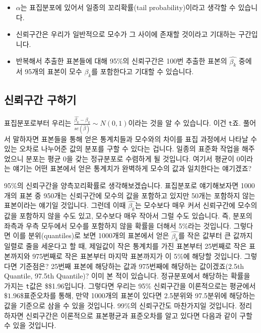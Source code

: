 \documentclass[
]{book}
\begin{document}
\begin{itemize}
\item
  \(\alpha\)는 표집분포에 있어서 일종의 꼬리확률(tail probability)이라고 생각할 수 있습니다.
\item
  신뢰구간은 우리가 일반적으로 모수가 그 사이에 존재할 것이라고 기대하는 구간입니다.
\item
  반복해서 추출한 표본들에 대해 95\%의 신뢰구간은 100번 추출한 표본의 \(\hat{\beta_k}\) 중에서 95개의 표본이 모수 \(\beta_k\)를 포함한다고 기대할 수 있습니다.
\end{itemize}

\hypertarget{uxc2e0uxb8b0uxad6cuxac04-uxad6cuxd558uxae30}{%
\subsection{신뢰구간 구하기}\label{uxc2e0uxb8b0uxad6cuxac04-uxad6cuxd558uxae30}}

표집분포로부터 우리는 \(\frac{\hat{\beta_k}-\beta_k}{se(\hat{\beta})} \sim N(0,1)\)이라는 것을 알 수 있습니다. 이건 \texttt{t}죠. 풀어서 말하자면 표본들을 통해 얻은 통계치들과 모수와의 차이를 표집 과정에서 나타날 수 있는 오차로 나누어준 값의 분포를 구할 수 있다는 겁니다. 일종의 표준화 작업을 해주었으니 분포는 평균 0을 갖는 정규분포로 수렴하게 될 것입니다. 여기서 평균이 0이라는 얘기는 어떤 표본에서 얻은 통계치가 완벽하게 모수의 값과 일치한다는 얘기겠죠?

95\%의 신뢰구간을 양측꼬리확률로 생각해보겠습니다. 표집분포로 얘기해보자면 1000개의 표본 중 950개는 신뢰구간에 모수의 값을 포함하고 있지만 50개는 포함하지 않는 표본이라는 얘기일 것입니다. 그런데 이때 \(\hat{\beta_k}\)는 모수보다 매우 커서 신뢰구간에 모수의 값을 포함하지 않을 수도 있고, 모수보다 매우 작아서 그럴 수도 있습니다. 즉, 분포의 좌측과 우측 모두에서 모수를 포함하지 않을 확률을 더해서 5\%라는 것입니다. 그렇다면 이를 분위(quantiles)로 보면 1000개의 표본에서 얻은 \(\hat{\beta_k}\)를 작은 값부터 큰 값까지 일렬로 줄을 세운다고 할 때, 제일값이 작은 통계치를 가진 표본부터 25번째로 작은 표본까지와 975번째로 작은 표본부터 마지막 표본까지가 이 5\%에 해당할 것입니다. 그렇다면 기준점은? 25번째 표본에 해당하는 값과 975번째에 해당하는 값이겠죠(2.5th Quantile, 97.5th Quantile)? 이미 본 적이 있습니다. 정규분포에서 해당하는 확률을 가지는 \texttt{t}값은 \$\pm\$1.96입니다. 그렇다면 우리는 95\% 신뢰구간을 이론적으로는 평균에서 \$\pm\(1.96\)\times\$표준오차를 통해, 만약 1000개의 표본이 있다면 2.5분위와 97.5분위에 해당하는 값을 기준으로 삼을 수 있을 것입니다. 99\%의 신뢰구간도 마찬가지일 것입니다. 정리하자면 신뢰구간은 이론적으로 표본평균과 표준오차를 알고 있다면 다음과 같이 구할 수 있을 것입니다.
\end{document}

